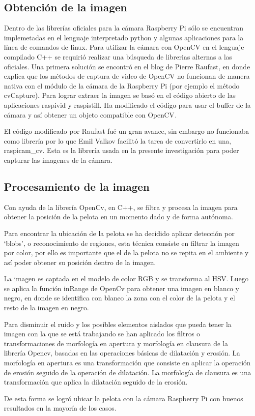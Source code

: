 \subsection{Obtenci\'on de la imagen}\label{extraerImagen}

Dentro de las librerías oficiales para la cámara Raspberry Pi s\'olo se encuentran implemetadas en el lenguaje interpretado python y algunas aplicaciones para la línea de comandos de linux. Para utilizar la cámara con OpenCV en el lenguaje compilado C++ se requirió realizar una búsqueda de librerias alternas a las oficiales. Una primera solución se encontró en el blog de Pierre Raufast, en donde explica que los métodos de captura de video de OpenCV no funcionan de manera nativa con el m\'odulo de la cámara de la Raspberry Pi (por ejemplo el método cvCapture). Para lograr extraer la imagen se basó en el código abierto de las aplicaciones raspivid y raspistill. Ha modificado el código para usar el buffer de la cámara y así obtener un objeto compatible con OpenCV. 

El código modificado por Raufast fué un gran avance, sin embargo no funcionaba como librería por lo que Emil Valkov facilitó la tarea de convertirlo en una, raspicam\_cv. Esta es la librería usada en la presente investigación para poder capturar las imagenes de la cámara. 

\subsection{Procesamiento de la imagen}\label{procesarImagen}

Con ayuda de la librería OpenCv, en C++, se filtra y procesa la imagen para obtener la posición de la pelota en un momento dado y de forma autónoma. 

Para encontrar la ubicación de la pelota  se ha decidido aplicar detección por ‘blobs’, o reconocimiento de regiones, esta técnica consiste en filtrar la imagen por color, por ello es importante que el de la pelota no se repita en el ambiente y así poder obtener su posición dentro de la imagen.

La imagen es captada en el modelo de color RGB y se transforma al HSV. Luego se aplica la función inRange de OpenCv para obtener una imagen en blanco y negro, en donde se identifica con blanco la zona con el color de la pelota y el resto de la imagen en negro. 

Para disminuir el ruido y los posibles elementos aislados que pueda tener la imagen con la que se está trabajando se han aplicado los filtros o transformaciones de morfología en apertura y morfología en clausura de la librería Opencv, basadas en las operaciones básicas de dilatación y erosión. La morfología en apertura es una transformación que consiste en aplicar la operación de erosión seguido de la operación de dilatación. La morfología de clausura es una transformación que aplica la dilatación seguido de la erosión.

De esta forma se logró ubicar la pelota con la cámara Raspberry Pi con buenos resultados en la mayoría de los casos. 
 


